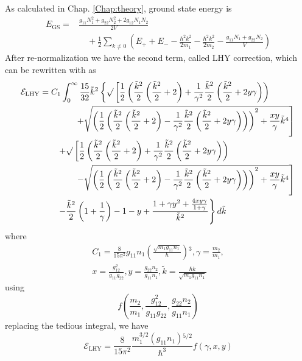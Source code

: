 As calculated in Chap. \ref{Chap:theory}, ground state energy is
\begin{equation}
\begin{split}
E_{\text{GS}}=&\frac{g_{11}N_1^2+g_{22}N_2^2+2g_{12}N_1N_2}{2V}\\
&\quad+\frac{1}{2}\sum _{k\neq 0} \left(E_++E_--\frac{\hbar ^2k^2}{2m_1}-\frac{\hbar^2k^2}{2m_2}-\frac{g_{11}N_1+g_{22}N_2}{V}\right)
\end{split}
\end{equation}
After re-normalization we have the second term, called LHY correction, which can be rewritten with as 
\begin{equation}
\begin{split}
\mathcal{E}_{\text{LHY}}&=C_1\int_0^{\infty}\frac{15}{32}\tilde{k}^2\left\{\surd\left[\frac{1}{2}\left(\frac{\tilde{k}^2}{2}\left(\frac{\tilde{k}^2}{2}+2\right)+\frac{1}{\gamma^2}\frac{\tilde{k}^2}{2}\left(\frac{\tilde{k}^2}{2}+2y \gamma\right)\right)\right.\right.\\
&\qquad\qquad\left.\left.+\sqrt{\left(\frac{1}{2}\left(\frac{\tilde{k}^2}{2}\left(\frac{\tilde{k}^2}{2}+2\right)-\frac{1}{\gamma^2}\frac{\tilde{k}^2}{2}\left(\frac{\tilde{k}^2}{2}+2y\gamma\right)\right)\right)^2+\frac{x y}{\gamma}\tilde{k}^4}\right]\right.\\
&\qquad\left.+\surd\left[\frac{1}{2}\left(\frac{\tilde{k}^2}{2}\left(\frac{\tilde{k}^2}{2}+2\right)+\frac{1}{\gamma^2}\frac{\tilde{k}^2}{2}\left(\frac{\tilde{k}^2}{2}+2y\gamma\right)\right)\right.\right.\\
&\qquad\qquad\left.\left.-\sqrt{\left(\frac{1}{2}\left(\frac{\tilde{k}^2}{2}\left(\frac{\tilde{k}^2}{2}+2\right)-\frac{1}{\gamma^2}\frac{\tilde{k}^2}{2}\left(\frac{\tilde{k}^2}{2}+2y\gamma\right)\right)\right)^2+\frac{xy}{\gamma}\tilde{k}^4}\right]\right.\\
&\qquad\left.-\frac{\tilde{k}^2}{2}\left(1+\frac{1}{\gamma}\right)-1-y+\frac{1+\gamma y^2+\frac{4xy\gamma}{1+\gamma}}{\tilde{k}^2}\right\}d\tilde{k}
\end{split}
\end{equation}
where
\begin{equation}
\begin{split}
C_1=\frac{8}{15\pi ^2}g_{11}n_1\left(\frac{\sqrt{m_1g_{11}n_1}}{\hbar }\right){}^3, \gamma =\frac{m_2}{m_1},\\
x=\frac{g_{12}^2}{g_{11}g_{22}},y=\frac{g_{22}n_2}{g_{11}n_1},\tilde{k}=\frac{\hbar  k}{\sqrt{m_1g_{11}n_1}}
\end{split}
\end{equation}
using \begin{equation}f\left(\frac{m_2}{m_1},\frac{g_{12}^2}{g_{11}g_{22}},\frac{g_{22}n_2}{g_{11}n_1}\right)\end{equation} replacing the tedious integral, we have
\begin{equation}\mathcal{E}_{\text{LHY}}=\frac{8}{15\pi ^2}\frac{m_1^{3/2}\left(g_{11}n_1\right){}^{5/2}}{\hbar ^3}f(\gamma ,x,y)\end{equation}

